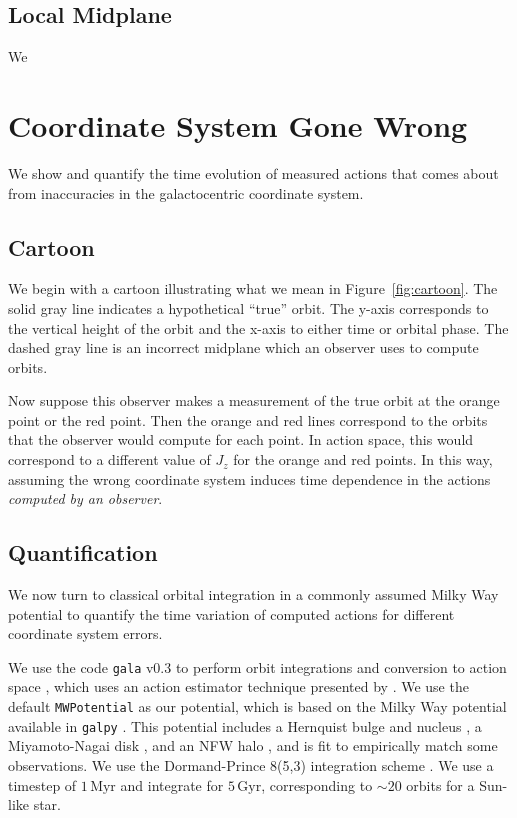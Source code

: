 \documentclass[twocolumn]{aastex62}
\newcommand{\Myr}{\text{Myr}}
\newcommand{\Gyr}{\text{Gyr}}
\begin{document}
\subsection{Local Midplane} \label{sec:local_midplane}
We 

\section{Coordinate System Gone Wrong} \label{sec:ref_frame}
We show and quantify the time evolution of measured actions that comes about
from inaccuracies in the galactocentric coordinate system.

\subsection{Cartoon} \label{ssec:cartoon}
We begin with a cartoon illustrating what we mean in Figure~\ref{fig:cartoon}.
The solid gray line indicates a hypothetical ``true'' orbit. The y-axis
corresponds to the vertical height of the orbit and the x-axis to either time
or orbital phase. The dashed gray line is an incorrect midplane which an
observer uses to compute orbits.

Now suppose this observer makes a measurement of the true orbit at the orange
point or the red point. Then the orange and red lines correspond to the orbits
that the observer would compute for each point. In action space, this would
correspond to a different value of $J_z$ for the orange and red points. In
this way, assuming the wrong coordinate system induces time dependence in the
actions {\em computed by an observer}.

\begin{figure*}
\caption{Caption.}
\label{fig:cartoon}
\end{figure*}

\subsection{Quantification} \label{ssec:quant}
We now turn to classical orbital integration in a commonly assumed Milky Way
potential to quantify the time variation of computed actions for different
coordinate system errors.

We use the code \texttt{gala} v0.3 to perform orbit integrations and
conversion to action space \citep{2017JOSS....2..388P,Price-Whelan:2018},
which uses an action estimator technique presented by
\citet{2014MNRAS.441.3284S}. We use the default \texttt{MWPotential} as our
potential, which is based on the Milky Way potential available in
\texttt{galpy} \citep{2015ApJS..216...29B}. This potential includes a
Hernquist bulge and nucleus \citep{1990ApJ...356..359H}, a Miyamoto-Nagai disk
\citep{1975PASJ...27..533M}, and an NFW halo \citep{1997ApJ...490..493N}, and
is fit to empirically match some observations. We use the Dormand-Prince
8(5,3) integration scheme \citep{Dormand80:integrator}. We use a timestep of
$1\,\Myr$ and integrate for $5\,\Gyr$, corresponding to $\sim 20$ orbits for
a Sun-like star.
\end{document}
